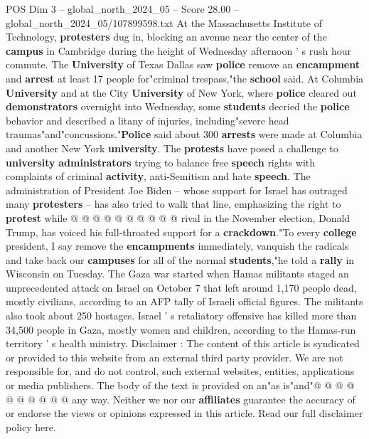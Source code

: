 \begin{textsample}{POS Dim 3 – global\_north\_2024\_05 – Score 28.00 – global\_north\_2024\_05/107899598.txt}
At the Massachusetts Institute of Technology, \textbf{protesters} dug in, blocking an avenue near the center of the \textbf{campus} in Cambridge during the height of Wednesday afternoon ' s rush hour commute.
The \textbf{University} of Texas Dallas saw \textbf{police} remove an \textbf{encampment} and \textbf{arrest} at least 17 people for"criminal trespass,"the \textbf{school} said.
At Columbia \textbf{University} and at the City \textbf{University} of New York, where \textbf{police} cleared out \textbf{demonstrators} overnight into Wednesday, some \textbf{students} decried the \textbf{police} behavior and described a litany of injuries, including"severe head traumas"and"concussions."\textbf{Police} said about 300 \textbf{arrests} were made at Columbia and another New York \textbf{university}.
The \textbf{protests} have posed a challenge to \textbf{university} \textbf{administrators} trying to balance free \textbf{speech} rights with complaints of criminal \textbf{activity}, anti-Semitism and hate \textbf{speech}.
The administration of President Joe Biden -- whose support for Israel has outraged many \textbf{protesters} -- has also tried to walk that line, emphasizing the right to \textbf{protest} while @ @ @ @ @ @ @ @ @ @ rival in the November election, Donald Trump, has voiced his full-throated support for a \textbf{crackdown}."To every \textbf{college} president, I say remove the \textbf{encampments} immediately, vanquish the radicals and take back our \textbf{campuses} for all of the normal \textbf{students},"he told a \textbf{rally} in Wisconsin on Tuesday.
The Gaza war started when Hamas militants staged an unprecedented attack on Israel on October 7 that left around 1,170 people dead, mostly civilians, according to an AFP tally of Israeli official figures.
The militants also took about 250 hostages.
Israel ' s retaliatory offensive has killed more than 34,500 people in Gaza, mostly women and children, according to the Hamas-run territory ' s health ministry.
Disclaimer : The content of this article is syndicated or provided to this website from an external third party provider.
We are not responsible for, and do not control, such external websites, entities, applications or media publishers.
The body of the text is provided on an"as is"and"@ @ @ @ @ @ @ @ @ @ any way.
Neither we nor our \textbf{affiliates} guarantee the accuracy of or endorse the views or opinions expressed in this article.
Read our full disclaimer policy here.

\end{textsample}
